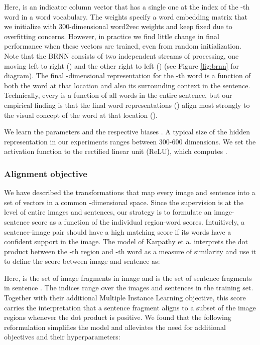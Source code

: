 \documentclass[10pt,twocolumn,letterpaper]{article}
\begin{document}
Here,  is an indicator column vector that has a single one at the index of the -th word in a word vocabulary. The weights  specify a word embedding matrix that we initialize with 300-dimensional word2vec \cite{mikolov2013distributed} weights and keep fixed due to overfitting concerns. However, in practice we find little change in final performance when these vectors are trained, even from random initialization. Note that the BRNN consists of two independent streams of processing, one moving left to right () and the other right to left () (see Figure \ref{fig:brnn} for diagram). The final -dimensional representation  for the -th word is a function of both the word at that location and also its surrounding context in the sentence. Technically, every  is a function of all words in the entire sentence, but our empirical finding is that the final word representations () align most strongly to the visual concept of the word at that location ().

We learn the parameters  and the respective biases . A typical size of the hidden representation in our experiments ranges between 300-600 dimensions. We set the activation function  to the rectified linear unit (ReLU), which computes .

\vspace{-0.1in}
\subsubsection{Alignment objective}
\label{sec:rankingloss}
\vspace{-0.1in}

We have described the transformations that map every image and sentence into a set of vectors in a common -dimensional space. Since the supervision is at the level of entire images and sentences, our strategy is to formulate an image-sentence score as a function of the individual region-word scores. Intuitively, a sentence-image pair should have a high matching score if its words have a confident support in the image. The model of Karpathy et a. \cite{defrag} interprets the dot product  between the -th region and -th word as a measure of similarity and use it to define the score between image  and sentence  as:

\vspace{-0.15in}

\vspace{-0.15in}

Here,  is the set of image fragments in image  and  is the set of sentence fragments in sentence . The indices  range over the images and sentences in the training set. Together with their additional Multiple Instance Learning objective, this score carries the interpretation that a sentence fragment aligns to a subset of the image regions whenever the dot product is positive. We found that the following reformulation simplifies the model and alleviates the need for additional objectives and their hyperparameters:
\end{document}
